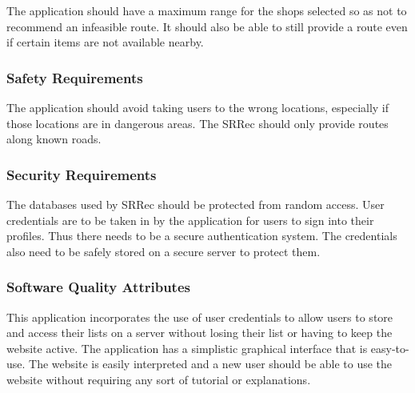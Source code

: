 \documentclass[10pt, a4paper, onecolumn]{scrartcl}
\begin{document}
			The application should have a maximum range for the shops selected so as not to recommend an infeasible route. It should also be able to still provide a route even if certain items are not available nearby.
		
		\subsubsection{Safety Requirements}
		
			The application should avoid taking users to the wrong locations, especially if those locations are in dangerous areas. The SRRec should only provide routes along known roads.
		
		\subsubsection{Security Requirements}
		
			The databases used by SRRec should be protected from random access. User credentials are to be taken in by the application for users to sign into their profiles. Thus there needs to be a secure authentication system. The credentials also need to be safely stored on a secure server to protect them.
		
		\subsubsection{Software Quality Attributes}
			
			This application incorporates the use of user credentials to allow users to store and access their lists on a 	server without losing their list or having to keep the website active. The application has a simplistic graphical interface that is easy-to-use. The website is easily interpreted and a new user should be able to use the website without requiring any sort of tutorial or explanations.
		
%		
		
	
	
	
\end{document}
